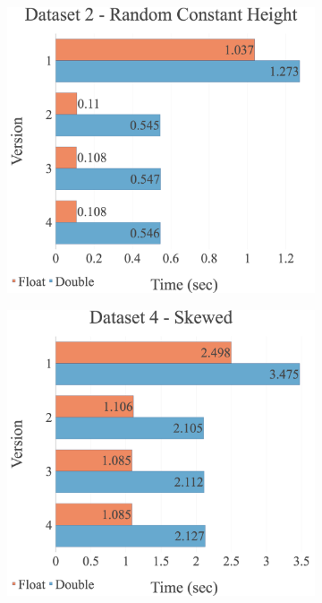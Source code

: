 \begin{figure}[H]
\centering
\begin{subfigure}{.49\textwidth}
  \centering
  \includegraphics[width=1\linewidth]{img/experiments/option-versions-2_RANDCONSTHEIGHT.png}
\end{subfigure}
\begin{subfigure}{.49\textwidth}
  \centering
  \includegraphics[width=1\linewidth]{img/experiments/option-versions-4_SKEWED.png}

\end{subfigure}
\end{figure}

